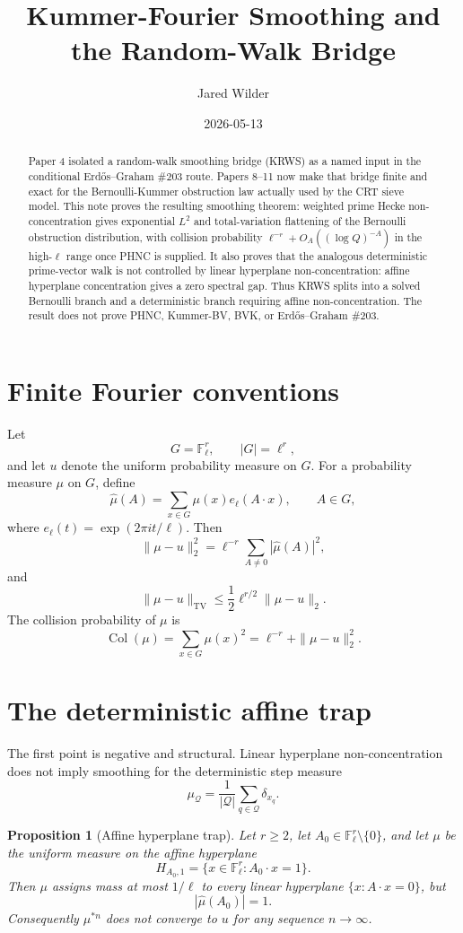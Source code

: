 \documentclass[11pt]{article}
\title{Kummer-Fourier Smoothing and the Random-Walk Bridge}
\author{Jared Wilder}
\date{2026-05-13}
\newtheorem{proposition}{Proposition}
\newcommand{\F}{\mathbb F}
\newcommand{\TV}{\mathrm{TV}}
\begin{document}
\maketitle

\begin{abstract}
Paper 4 isolated a random-walk smoothing bridge (KRWS) as a named input in the conditional Erd\H{o}s--Graham \#203 route.  Papers 8--11 now make that bridge finite and exact for the Bernoulli-Kummer obstruction law actually used by the CRT sieve model.  This note proves the resulting smoothing theorem: weighted prime Hecke non-concentration gives exponential \(L^2\) and total-variation flattening of the Bernoulli obstruction distribution, with collision probability \(\ell^{-r}+O_A((\log Q)^{-A})\) in the high-\(\ell\) range once PHNC is supplied.  It also proves that the analogous deterministic prime-vector walk is not controlled by linear hyperplane non-concentration: affine hyperplane concentration gives a zero spectral gap.  Thus KRWS splits into a solved Bernoulli branch and a deterministic branch requiring affine non-concentration.  The result does not prove PHNC, Kummer-BV, BVK, or Erd\H{o}s--Graham \#203.
\end{abstract}

\section{Finite Fourier conventions}

Let
\[
G=\F_\ell^r,\qquad |G|=\ell^r,
\]
and let \(u\) denote the uniform probability measure on \(G\).  For a probability measure \(\mu\) on \(G\), define
\[
\widehat\mu(A)=\sum_{x\in G}\mu(x)e_\ell(A\cdot x),
\qquad A\in G,
\]
where \(e_\ell(t)=\exp(2\pi i t/\ell)\).  Then
\[
\|\mu-u\|_2^2
=
\ell^{-r}\sum_{A\ne0}|\widehat\mu(A)|^2,
\]
and
\[
\|\mu-u\|_{\TV}
\le
\frac12\ell^{r/2}\|\mu-u\|_2.
\]
The collision probability of \(\mu\) is
\[
\operatorname{Col}(\mu)=\sum_{x\in G}\mu(x)^2
=
\ell^{-r}+\|\mu-u\|_2^2.
\]

\section{The deterministic affine trap}

The first point is negative and structural.  Linear hyperplane non-concentration does not imply smoothing for the deterministic step measure
\[
\mu_{\mathcal Q}=\frac1{|\mathcal Q|}\sum_{q\in\mathcal Q}\delta_{x_q}.
\]

\begin{proposition}[Affine hyperplane trap]\label{P:affine-trap}
Let \(r\ge2\), let \(A_0\in\F_\ell^r\setminus\{0\}\), and let \(\mu\) be the uniform measure on the affine hyperplane
\[
H_{A_0,1}=\{x\in\F_\ell^r:A_0\cdot x=1\}.
\]
Then \(\mu\) assigns mass at most \(1/\ell\) to every linear hyperplane \(\{x:A\cdot x=0\}\), but
\[
|\widehat\mu(A_0)|=1.
\]
Consequently \(\mu^{*n}\) does not converge to \(u\) for any sequence \(n\to\infty\).
\end{proposition}
\end{document}
